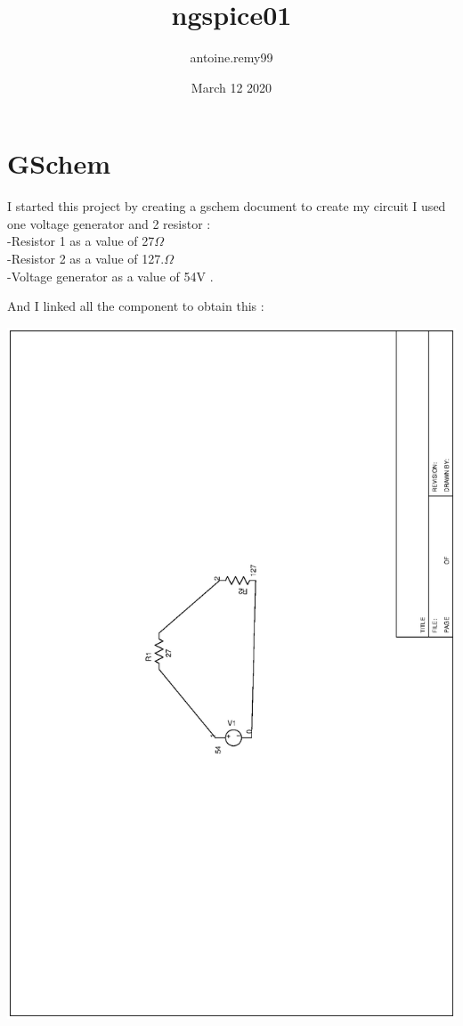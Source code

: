 \documentclass{article}
\title{ngspice01}
\author{antoine.remy99 }
\date{March 12 2020}
\begin{document}
\maketitle

\section{GSchem}

I started this project by creating a gschem document to create my circuit I used one voltage generator and 2 resistor :
\\
-Resistor 1 as a value of  27\begin{math}\Omega\end{math}
\\
-Resistor 2 as a value of 127.\begin{math}\Omega\end{math}
\\
-Voltage generator as a value of 54V .\newline

And I linked all the component to obtain this :
\begin{center}
    \includegraphics[scale = 0.25,angle=270]{picture/01.ps}
\end{center}
\end{document}
